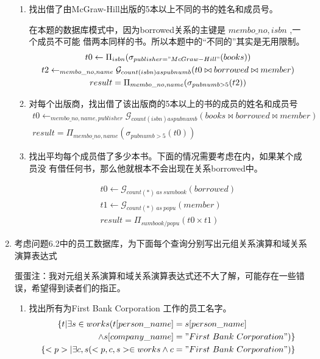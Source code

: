 \documentclass{dingjia}
\begin{document}
\begin{enumerate}
\begin{enumerate}
  \item 找出借了由McGraw-Hill出版的5本以上不同的书的姓名和成员号。

    在本题的数据库模式中，因为borrowed关系的主键是 $membo\_no,isbn$ ,一个成员不可能
    借两本同样的书。所以本题中的“不同的”其实是无用限制。
    \begin{gather*}
      t0 \leftarrow \Pi_{isbn}(\sigma_{publisher = "McGraw-Hill"}(books)) \\
      t2 \leftarrow _{membo\_no,name}\mathcal{G}_{count(isbn) as pubnumb}(t0 \bowtie borrowed \bowtie member) \\
      result = \Pi_{membo\_no,name}(\sigma_{pubnumb > 5}(t2))
    \end{gather*}

  \item 对每个出版商，找出借了该出版商的5本以上的书的成员的姓名和成员号
    \begin{gather*}
      t0 \leftarrow _{membo\_no,name, publisher}\mathcal{G}_{count(isbn) as pubnumb}(books \bowtie borrowed \bowtie member) \\
      result = \Pi_{membo\_no,name}(\sigma_{pubnumb > 5}(t0))
    \end{gather*}

  \item 找出平均每个成员借了多少本书。下面的情况需要考虑在内，如果某个成员没
    有借任何书，那么他就根本不会出现在关系borrowed中。

    \begin{gather*}
      t0 \leftarrow \mathcal{G}_{count(*)\ as\ sumbook}(borrowed) \\
      t1 \leftarrow \mathcal{G}_{count(*)\ as\ popu}(member) \\
      result = \Pi_{sumbook/popu}(t0 \times t1)
    \end{gather*}
  \end{enumerate}

\item 考虑问题6.2中的员工数据库，为下面每个查询分别写出元组关系演算和域关系
  演算表达式

  蛋蛋注：我对元组关系演算和域关系演算表达式还不大了解，可能存在一些错误，希望得到读者们的指正。


  \begin{enumerate}
  \item 找出所有为First Bank Corporation 工作的员工名字。
    \begin{align*}
      \{ t  |  \exists s \in works(t[person\_name] & = s[person\_name] \\
      \land  s[company\_name] & = "First\ Bank\ Corporation")\} \\
      \{<p> |  \exists  c,s(<p,c,s> \in works \land c & = "First\ Bank\ Corporation")\}
    \end{align*}


\end{enumerate}
\end{enumerate}
\end{document}
